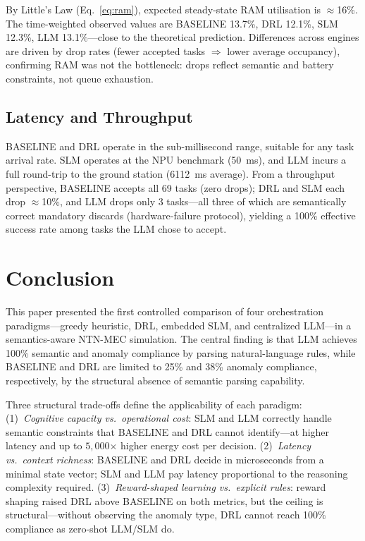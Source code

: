 \documentclass[conference,comsoc,twoside,caption=false]{IEEEtran}
\theoremstyle{definition}
\begin{document}
By Little's Law (Eq.~\ref{eq:ram}), expected steady-state RAM utilisation is
$\approx$16\%. The time-weighted observed values are BASELINE
13.7\%, DRL 12.1\%, SLM
12.3\%, LLM 13.1\%---close
to the theoretical prediction. Differences across engines are driven by drop
rates (fewer accepted tasks $\Rightarrow$ lower average occupancy), confirming
RAM was not the bottleneck: drops reflect semantic and battery constraints, not
queue exhaustion.

\subsection{Latency and Throughput}

\balance
BASELINE and DRL operate in the sub-millisecond range, suitable for any task
arrival rate. SLM operates at the NPU benchmark (\SI{50}{\milli\second}), and
LLM incurs a full round-trip to the ground station
(\SI{6112}{\milli\second} average). From a throughput
perspective, BASELINE accepts all 69 tasks (zero drops); DRL and
SLM each drop $\approx$10\%, and LLM drops only 3 tasks---all
three of which are semantically correct mandatory discards (hardware-failure
protocol), yielding a 100\% effective success rate among tasks the LLM chose
to accept.

\section{Conclusion}
\label{sec:conclusion}

This paper presented the first controlled comparison of four orchestration
paradigms---greedy heuristic, DRL, embedded \ac{SLM}, and centralized
\ac{LLM}---in a semantics-aware NTN-MEC simulation. The central finding is
that LLM achieves 100\% semantic and anomaly
compliance by parsing natural-language rules, while BASELINE and DRL are
limited to 25\% and
38\% anomaly compliance, respectively, by the
structural absence of semantic parsing capability.

Three structural trade-offs define the applicability of each paradigm:
(1)~\emph{Cognitive capacity vs.\ operational cost}: SLM and LLM correctly
handle semantic constraints that BASELINE and DRL cannot identify---at higher
latency and up to $5{,}000$$\times$ higher energy cost per decision.
(2)~\emph{Latency vs.\ context richness}: BASELINE and DRL decide in
microseconds from a minimal state vector; SLM and LLM pay latency proportional
to the reasoning complexity required.
(3)~\emph{Reward-shaped learning vs.\ explicit rules}: reward shaping raised
DRL above BASELINE on both metrics, but the ceiling is structural---without
observing the anomaly type, DRL cannot reach 100\% compliance as zero-shot
LLM/SLM do.
\end{document}
